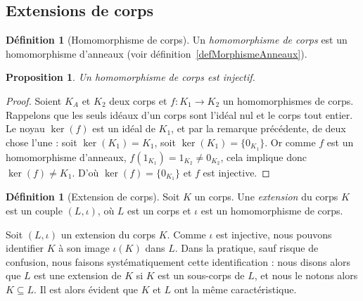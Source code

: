 \documentclass[a4paper, titlepage]{article}
\newtheorem{prop}[theo]{Proposition}
\theoremstyle{definition}
\newtheorem{defi}[theo]{Définition}
\theoremstyle{remark}
\begin{document}
\subsection{Extensions de corps}

\begin{defi}[Homomorphisme de corps]
Un \textit{homomorphisme de corps} est un homomorphisme d'anneaux (voir définition~\ref{defMorphismeAnneaux}).
\end{defi}

\begin{prop}
Un homomorphisme de corps est injectif.
\end{prop}

\begin{proof}
Soient $K_A$ et $K_2$ deux corps et $f : K_1 \rightarrow K_2$ un homomorphismes de corps. Rappelons que les seuls idéaux d'un corps sont l'idéal nul et le corps tout entier. Le noyau $\ker(f)$ est un idéal de $K_1$, et par la remarque précédente, de deux chose l'une : soit $\ker(K_1) = K_1$, soit $\ker(K_1)=\{0_{K_1}\}$. Or comme $f$ est un homomorphisme d'anneaux, $f(1_{K_1}) = 1_{K_2} \neq 0_{K_2}$, cela implique donc $\ker(f) \neq K_1$. D'où $\ker(f) = \{0_{K_1}\}$ et $f$ est injective.
\end{proof}

\begin{defi}[Extension de corps]
Soit $K$ un corps. Une \textit{extension} du corps $K$ est un couple $(L, \iota)$, où $L$ est un corps et $\iota$ est un homomorphisme de corps.
\end{defi}

Soit $(L, \iota)$ un extension du corps $K$. Comme $\iota$ est injective, nous pouvons identifier $K$ à son image $\iota(K)$ dans $L$. Dans la pratique, sauf risque de confusion, nous faisons systématiquement cette identification : nous disons alors que $L$ est une extension de $K$ si $K$ est un sous-corps de $L$, et nous le notons alors $K\subseteq L$. Il est alors évident que $K$ et $L$ ont la même caractéristique.
\end{document}
